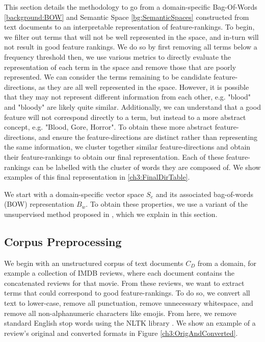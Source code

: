 This section details the methodology to go from a domain-specific Bag-Of-Words \ref{background:BOW} and Semantic Space \ref{bg:SemanticSpaces} constructed from text documents to an interpretable representation of feature-rankings. To begin, we filter out terms that will not be well represented in the space, and in-turn will not result in good feature rankings. We do so by first removing all terms below a frequency threshold then, we use various metrics to directly evaluate the representation of each term in the space and remove those that are poorly represented. We can consider the terms remaining to be candidate feature-directions, as they are all well represented in the space. However, it is possible that they may not represent different information from each other, e.g. "blood" and "bloody" are likely quite similar. Additionally, we can understand that a good feature will not correspond directly to a term, but instead to a more abstract concept, e.g. "Blood, Gore, Horror". To obtain these more abstract feature-directions, and ensure the feature-directions are distinct rather than representing the same information, we cluster together similar feature-directions and obtain their feature-rankings to obtain our final representation. Each of these feature-rankings can be labelled with the cluster of words they are composed of. We show examples of this final representation in \ref{ch3:FinalDirTable}.


We start with a domain-specific vector space $S_e$ and its associated bag-of-words (BOW) representation $B_w$. To obtain these properties, we use a variant of the unsupervised method proposed in \cite{derracAIJ}, which we explain in this section. 

\subsection{Corpus Preprocessing}

We begin with an unstructured corpus of text documents $C_D$ from a domain, for example a collection of IMDB reviews, where each document contains the concatenated reviews for that movie. From these reviews, we want to extract terms that could correspond to good feature-rankings. To do so, we convert all text to lower-case, remove all punctuation, remove unnecessary whitespace, and remove all non-alphanumeric characters like emojis. From here, we remove standard English stop words using the NLTK library \cite{Bird}. We show an example of a review's original and converted formats in Figure \ref{ch3:OrigAndConverted}.

